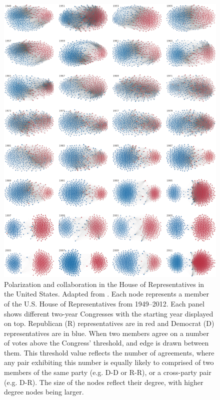 \documentclass[11pt]{article}
\begin{document}
\begin{figure}[H]
    \centering
    \includegraphics[width=.6\linewidth]{../plots/references/us_parlament.png}
  \caption{Polarization and collaboration in the House of Representatives in the United States. Adapted from \protect\citeauthor{andris_rise_2015} \protect\citeyear{andris_rise_2015}. Each node represents a member of the U.S. House of Representatives from 1949–2012. Each panel shows different two-year Congresses with the starting year displayed on top. Republican (R) representatives are in red and Democrat (D) representatives are in blue. When two members agree on a number of votes above the Congress' threshold, and edge is drawn between them. This threshold value reflects the number of agreements, where any pair exhibiting this number is equally likely to comprised of two members of the same party (e.g. D-D or R-R), or a cross-party pair (e.g. D-R). The size of the nodes reflect their degree, with higher degree nodes being larger.}
  \label{fig:house_of_reps}
\end{figure}
\end{document}
